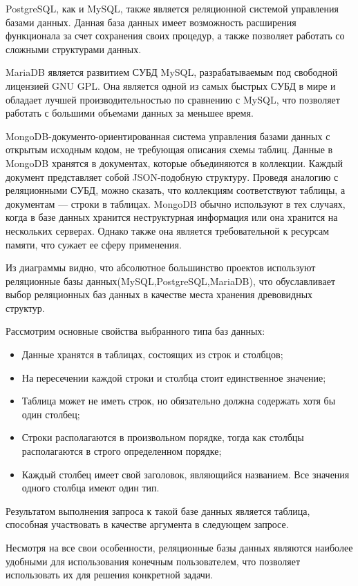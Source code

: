 \documentclass[a4paper,14pt]{extreport}
\theoremstyle{definition}
\begin{document}
PostgreSQL, как и MySQL, также является реляционной системой управления базами данных\cite{Redmond}. Данная база данных имеет возможность расширения функционала за счет сохранения своих процедур, а также позволяет работать со сложными структурами данных.

MariaDB является развитием СУБД MySQL, разрабатываемым под свободной лицензией GNU GPL. Она является одной из самых быстрых СУБД в мире и обладает лучшей производительностью по сравнению с MySQL, что позволяет работать с большими объемами данных за меньшее время.

MongoDB-документо-ориентированная система управления базами данных с открытым исходным кодом, не требующая описания схемы таблиц\cite{Banker}. Данные в MongoDB хранятся в документах, которые объединяются в коллекции. Каждый документ представляет собой JSON-подобную структуру. Проведя аналогию с реляционными СУБД, можно сказать, что коллекциям соответствуют таблицы, а документам — строки в таблицах. MongoDB обычно используют в тех случаях, когда в базе данных хранится неструктурная информация или она хранится на нескольких серверах. Однако также она является требовательной к ресурсам памяти, что сужает ее сферу применения.

Из диаграммы видно, что абсолютное большинство проектов используют реляционные базы данных(MySQL,PostgreSQL,MariaDB), что обуславливает выбор реляционных баз данных в качестве места хранения древовидных структур.

Рассмотрим основные свойства выбранного типа баз данных:
\begin{itemize}
\item Данные хранятся в таблицах, состоящих из строк и столбцов;
\item На пересечении каждой строки и столбца стоит единственное значение;
\item Таблица может не иметь строк, но обязательно должна содержать хотя бы один столбец;
\item Строки располагаются в произвольном порядке, тогда как столбцы располагаются в строго определенном порядке;
\item Каждый столбец имеет свой заголовок, являющийся названием. Все значения одного столбца имеют один тип.
\end{itemize}

Результатом выполнения запроса к такой базе данных является таблица, способная участвовать в качестве аргумента в следующем запросе.

Несмотря на все свои особенности, реляционные базы данных являются наиболее удобными для использования конечным пользователем, что позволяет использовать их для решения конкретной задачи.
\end{document}
